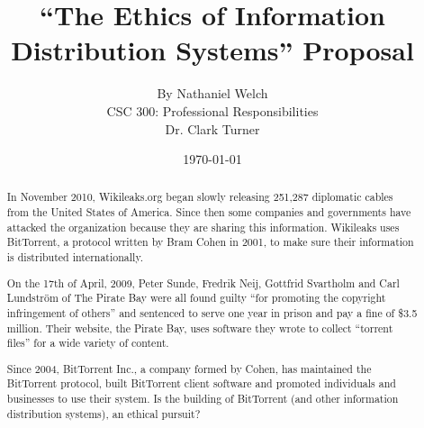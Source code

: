 \documentclass[11pt]{article}
\begin{document}
\title{\vfill ``The Ethics of Information Distribution Systems'' Proposal} %
\author{
By Nathaniel Welch\vspace{10pt}\\
CSC 300: Professional Responsibilities\vspace{10pt}\\
Dr. Clark Turner\vspace{10pt}\\
}
\date{\today}

\maketitle

\vfill %
\begin{abstract}

In November 2010, Wikileaks.org began slowly releasing 251,287 diplomatic cables from the United States of America. \cite{cablegate} Since then some companies and governments have attacked the organization because they are sharing this information. Wikileaks uses BitTorrent, a protocol written by Bram Cohen in 2001, to make sure their information is distributed internationally.

On the 17th of April, 2009, Peter Sunde, Fredrik Neij, Gottfrid Svartholm and Carl Lundström of The Pirate Bay were all found guilty ``for promoting the copyright infringement of others'' and sentenced to serve one year in prison and pay a fine of \$3.5 million. \cite{tpbverdict} Their website, the Pirate Bay, uses software they wrote to collect ``torrent files'' for a wide variety of content.

Since 2004, BitTorrent Inc., a company formed by Cohen, has maintained the BitTorrent protocol, built BitTorrent client software and promoted individuals and businesses to use their system. Is the building of BitTorrent (and other information distribution systems), an ethical pursuit?
\end{abstract}
\thispagestyle{empty} %
\newpage

\end{document}
